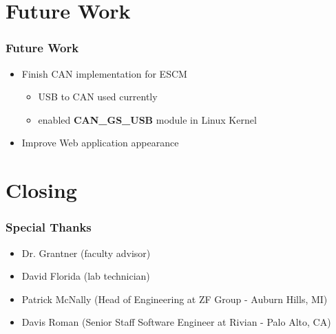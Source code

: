 \documentclass[8pt,compress,aspectratio=169]{beamer}
\newcommand\DarkBoldP[1]{\textcolor{VSPurpleDark}{\textbf{#1}}}
\begin{document}
\section{Future Work}
\begin{frame}
  \frametitle{Future Work}
  \begin{itemize}
    \item Finish CAN implementation for ESCM
      \begin{itemize}
        \item USB to CAN used currently
        \item enabled \DarkBoldP{CAN\_GS\_USB} module in Linux Kernel
      \end{itemize}
    \item Improve Web application appearance
  \end{itemize}

\end{frame}

\section{Closing}
\begin{frame}
  \frametitle{Special Thanks}
  \begin{itemize}
    \item Dr. Grantner (faculty advisor)
    \item David Florida (lab technician)
    \item Patrick McNally (Head of Engineering at ZF Group - Auburn Hills, MI)
    \item Davis Roman (Senior Staff Software Engineer at Rivian - Palo Alto, CA)
  \end{itemize}
\end{frame}
\end{document}
